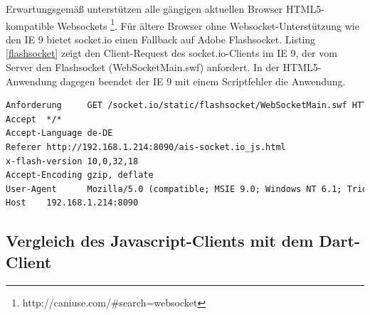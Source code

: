 Erwartungsgemäß unterstützen alle gängigen aktuellen Browser HTML5-kompatible Websockets \footnote{http://caniuse.com/\#search=websocket}. Für ältere Browser ohne Websocket-Unterstützung wie den IE 9 bietet socket.io einen Fallback auf Adobe Flashsocket. Listing \ref{flashsocket} zeigt den Client-Request des socket.io-Clients im IE 9, der vom Server den Flashsocket (WebSocketMain.swf) anfordert. In der HTML5-Anwendung dagegen beendet der IE 9  mit einem Scriptfehler die Anwendung.\\
\begin{lstlisting}[language=html,caption=socket.io Client-Request in Internet Explorer 9, label=flashsocket]
Anforderung     GET /socket.io/static/flashsocket/WebSocketMain.swf HTTP/1.1
Accept  */*
Accept-Language de-DE
Referer http://192.168.1.214:8090/ais-socket.io_js.html
x-flash-version 10,0,32,18
Accept-Encoding gzip, deflate
User-Agent      Mozilla/5.0 (compatible; MSIE 9.0; Windows NT 6.1; Trident/5.0)
Host    192.168.1.214:8090                            
\end{lstlisting}

\newpage
\subsection{Vergleich des Javascript-Clients mit dem Dart-Client} 
